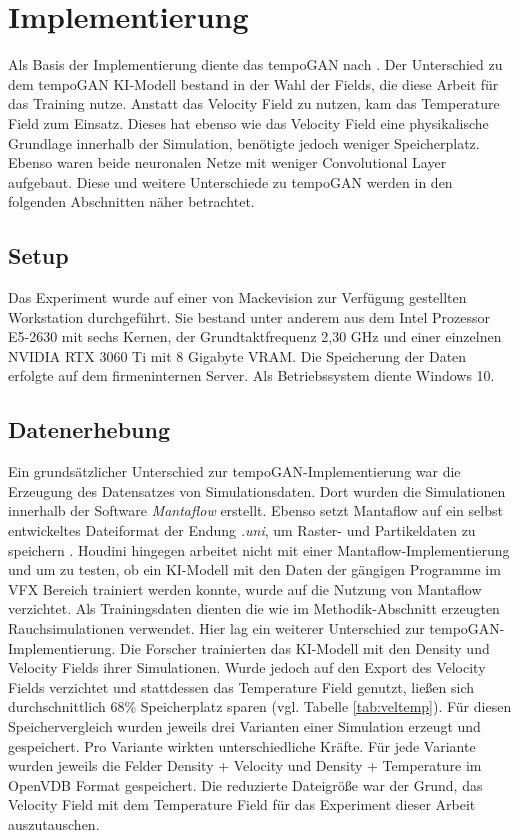 \chapter{Implementierung}
\thispagestyle{fancy}

Als Basis der Implementierung diente das tempoGAN nach \citet{xie2018tempoGAN}. Der Unterschied zu dem tempoGAN KI-Modell bestand in der Wahl der Fields, die diese Arbeit für das Training nutze. Anstatt das Velocity Field zu nutzen, kam das Temperature Field zum Einsatz. Dieses hat ebenso wie das Velocity Field eine physikalische Grundlage innerhalb der Simulation, benötigte jedoch weniger Speicherplatz. Ebenso waren beide neuronalen Netze mit weniger Convolutional Layer aufgebaut. Diese und weitere Unterschiede zu tempoGAN werden in den folgenden Abschnitten näher betrachtet.

\section{Setup}
Das Experiment wurde auf einer von Mackevision zur Verfügung gestellten Workstation durchgeführt. Sie bestand unter anderem aus dem Intel Prozessor E5-2630 mit sechs Kernen, der Grundtaktfrequenz 2,30 GHz und einer einzelnen NVIDIA RTX 3060 Ti mit 8 Gigabyte VRAM. Die Speicherung der Daten erfolgte auf dem firmeninternen Server. Als Betriebssystem diente Windows 10.


\section{Datenerhebung}
Ein grundsätzlicher Unterschied zur tempoGAN-Implementierung war die Erzeugung des Datensatzes von Simulationsdaten. Dort wurden die Simulationen innerhalb der Software \textit{Mantaflow} \parencite{mantaflow} erstellt. Ebenso setzt Mantaflow auf ein selbst entwickeltes Dateiformat der Endung \textit{.uni}, um Raster- und Partikeldaten zu speichern \parencite[]{thuerey-group-no-date}. Houdini hingegen arbeitet nicht mit einer Mantaflow-Implementierung und um zu testen, ob ein KI-Modell mit den Daten der gängigen Programme im VFX Bereich trainiert werden konnte, wurde auf die Nutzung von Mantaflow verzichtet. 
Als Trainingsdaten dienten die wie im Methodik-Abschnitt erzeugten Rauchsimulationen verwendet. Hier lag ein weiterer Unterschied zur tempoGAN-Implementierung. Die Forscher trainierten das KI-Modell mit den Density und Velocity Fields ihrer Simulationen. Wurde jedoch auf den Export des Velocity Fields verzichtet und stattdessen das Temperature Field genutzt, ließen sich durchschnittlich 68\% Speicherplatz sparen (vgl. Tabelle \ref{tab:veltemp}). Für diesen Speichervergleich wurden jeweils drei Varianten einer Simulation erzeugt und gespeichert. Pro Variante wirkten unterschiedliche Kräfte. Für jede Variante wurden jeweils die Felder Density + Velocity und Density + Temperature im OpenVDB Format gespeichert. Die reduzierte Dateigröße war der Grund, das Velocity Field mit dem Temperature Field für das Experiment dieser Arbeit auszutauschen.

